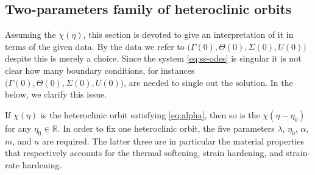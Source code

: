 \documentclass[a4paper,11pt]{article}
\def\BO{{\mathcal{O}}}
\theoremstyle{remark}
\begin{document}
%

\subsection{Two-parameters family of heteroclinic orbits} \label{sec:twoparam}
Assuming the $\chi(\eta)$, this section is devoted to give an interpretation of it in terms of the given data. By the data we refer to $\big(\Gamma(0),\Theta(0),\Sigma(0),U(0)\big)$ despite this is merely a choice. Since the system \eqref{eq:ss-odes} is singular it is not clear how many boundary conditions, for instances $\big(\Gamma(0),\Theta(0),\Sigma(0),U(0)\big)$, are needed to single out the solution. In the below, we clarify this issue.

If $\chi(\eta)$ is the heteroclinic orbit satisfying \eqref{eq:alpha}, then so is the $\chi(\eta-\eta_0)$ for any $\eta_0\in \mathbb{R}$. In order to fix one heteroclinic orbit, the five parameters $\lambda$, $\eta_0$, $\alpha$, $m$, and $n$ are required. The latter three are in particular the material properties that respectively accounts for the thermal softening, strain hardening, and strain-rate hardening.
\end{document}
